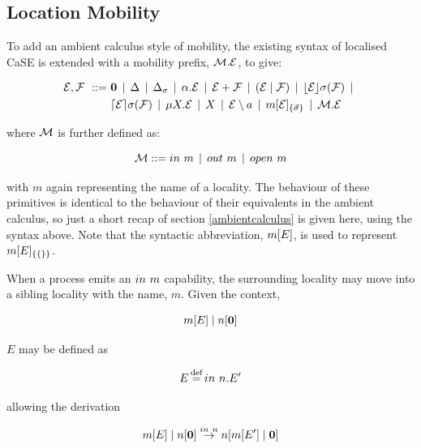 \subsection{Location Mobility}
\label{locmob}

To add an ambient calculus style of mobility, the existing syntax of
localised CaSE is extended with a mobility prefix, $\text{$\mathcal{M}$} . \text{$\mathcal{E}$}$,
to give:

\begin{equation}
  \begin{aligned}
    \text{$\mathcal{E}$}, \text{$\mathcal{F}$} \ ::=\ &
    \textbf{0}  \;\,|\,\; 
    \Delta \;\,|\,\; 
    \Delta_{\sigma} \;\,|\,\; 
    \alpha . \text{$\mathcal{E}$}  \;\,|\,\;
    \text{$\mathcal{E}$} + \text{$\mathcal{F}$} \;\,|\,\; 
    (\text{$\mathcal{E}$}\;|\;\text{$\mathcal{F}$})\;\,|\,\; 
    \lfloor{\text{$\mathcal{E}$}}\rfloor {\sigma} ({\text{$\mathcal{F}$}}) \;\,|\,\; \\
    & \lceil{\text{$\mathcal{E}$}}\rceil {\sigma} ({\text{$\mathcal{F}$}}) \;\,|\,\; 
    \mu X . \text{$\mathcal{E}$} \;\,|\,\; 
    X \;\,|\,\; 
    \text{$\mathcal{E}$} \setminus a \;\,|\,\; 
    {m}[ \text{$\mathcal{E}$} ]_{\{\vec{\sigma}\}} \;\,|\,\;
    \text{$\mathcal{M}$} . \text{$\mathcal{E}$}
  \end{aligned}
\end{equation}

\noindent where $\text{$\mathcal{M}$}$ is further defined as:

\begin{equation}
    \text{$\mathcal{M}$} ::= in\ m \;\,|\,\; out\ m \;\,|\,\; open\ m
\end{equation}

\noindent with $m$ again representing the name of a locality.  The
behaviour of these primitives is identical to the behaviour of their
equivalents in the ambient calculus, so just a short recap of section
\ref{ambientcalculus} is given here, using the syntax above.  Note that
the syntactic abbreviation, ${m}[ E ]$, is used to represent
${m}[ E ]_{\{\{\}\}}$.

When a process emits an $in\ m$ capability, the surrounding locality
may move into a sibling locality with the name, $m$.  Given the context,

\begin{equation}
{m}[ E ]\;|\;{n}[ \textbf{0} ]
\end{equation}

\noindent $E$ may be defined as

\begin{equation}
E \operatorname{\stackrel{\textrm{def}}{=}} in\ n.E^\prime
\end{equation}

\noindent allowing the derivation

\begin{equation}
{m}[ E ]\;|\;{n}[ \textbf{0} ] \stackrel{in\ n}{\rightarrow} 
{n}[ {m}[ E^\prime ]\;|\;\textbf{0} ]
\end{equation}


